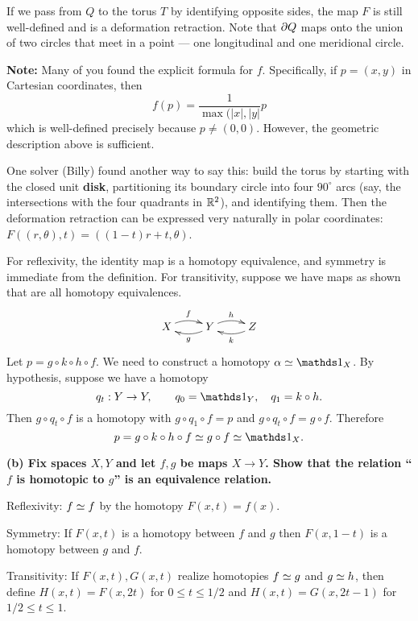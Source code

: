 
If we pass from $Q$ to the torus $T$ by identifying opposite sides, the map $F$ is still well-defined and is a deformation retraction.  Note that $\partial Q$ maps onto the union of two circles that meet in a point --- one longitudinal and one meridional circle.

{\bf Note:} Many of you found the explicit formula for $f$.  Specifically, if $p=(x,y)$ in Cartesian coordinates, then
\[f(p) = \frac{1}{\max(|x|,|y|}p\]
which is well-defined precisely because $p\neq(0,0)$.  However, the geometric description above is sufficient.

One solver (Billy) found another way to say this: build the torus by starting with the closed unit \textbf{disk}, partitioning its boundary circle into four $90^\circ$ arcs (say, the intersections with the four quadrants in $\mathbb{R}^2$), and identifying them.  Then the deformation retraction can be expressed very naturally in polar coordinates: $F((r,\theta),t)=((1-t)r+t,\theta)$.



\pagebreak

For reflexivity, the identity map is a homotopy equivalence, and symmetry is immediate from the definition.  For transitivity,  suppose we have maps as shown that are all homotopy equivalences.
\[\xymatrix{
X \ar@/^/[r]^f & Y\ar@/^/[l]^g\ar@/^/[r]^h & Z \ar@/^/[l]^k
}\]
Let $p=g\circ k\circ h\circ f$.  We need to construct a homotopy $\alpha\htop\IdMap_X$.  By hypothesis, suppose we have a homotopy
\[q_t:Y\to Y, \qquad q_0=\IdMap_Y,\quad q_1=k\circ h.\]
Then $g\circ q_t\circ f$ is a homotopy
with  $g\circ q_1\circ f=p$ and $g\circ q_t\circ f=g\circ f$.  Therefore
\[p =  g\circ k\circ h\circ f \htop g\circ f \htop \IdMap_X.\]

{\bf (b) Fix spaces $X,Y$ and let $f,g$ be maps $X\to Y$.  Show that the relation ``$f$ is homotopic to $g$'' is an equivalence relation.}

Reflexivity: $f\simeq f$ by the homotopy $F(x,t)=f(x)$.

Symmetry: If $F(x,t)$ is a homotopy between $f$ and $g$ then $F(x,1-t)$ is a homotopy between $g$ and $f$.

Transitivity: If $F(x,t),G(x,t)$ realize homotopies $f\simeq g$ and $g\simeq h$, then define $H(x,t)=F(x,2t)$ for $0\leq t\leq 1/2$ and $H(x,t)=G(x,2t-1)$ for $1/2\leq t\leq 1$.

